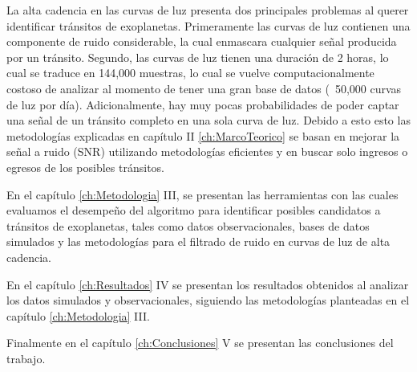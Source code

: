 La alta cadencia en las curvas de luz presenta dos principales problemas al querer identificar tránsitos de exoplanetas. Primeramente las curvas de luz contienen una componente de ruido considerable, la cual enmascara cualquier señal producida por un tránsito. Segundo, las curvas de luz tienen una duración de 2 horas, lo cual se traduce en 144,000 muestras, lo cual se vuelve computacionalmente costoso de analizar al momento de tener una gran base de datos (~50,000 curvas de luz por día). Adicionalmente, hay muy pocas probabilidades de poder captar una señal de un tránsito completo en una sola curva de luz. Debido a esto esto las metodologías explicadas en capítulo II \ref{ch:MarcoTeorico} se basan en mejorar la señal a ruido (SNR) utilizando metodologías eficientes y en buscar solo ingresos o egresos de los posibles tránsitos.

En el capítulo \ref{ch:Metodologia} III, se presentan las herramientas con las cuales evaluamos el desempeño del algoritmo para identificar posibles candidatos a tránsitos de exoplanetas, tales como datos observacionales, bases de datos simulados y las metodologías para el filtrado de ruido en curvas de luz de alta cadencia.

En el capítulo \ref{ch:Resultados} IV se presentan los resultados obtenidos al analizar los datos simulados y observacionales, siguiendo las metodologías planteadas en el capítulo \ref{ch:Metodologia} III.

Finalmente en el capítulo \ref{ch:Conclusiones} V se presentan las conclusiones del trabajo.













